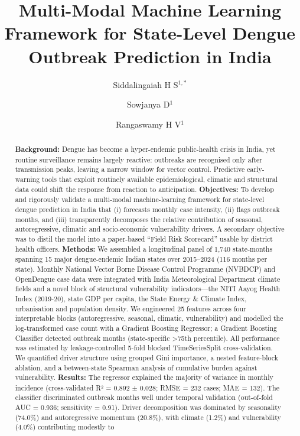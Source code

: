 \documentclass[
  10pt,
  twocolumn]{article}
\title{Multi-Modal Machine Learning Framework for State-Level Dengue
Outbreak Prediction in India}
\author{Siddalingaiah H S\(^{1,*}\) \and Sowjanya
D\(^{1}\) \and Rangaswamy H V\(^{1}\)}
\date{}
\begin{document}
\maketitle
\begin{abstract}
\textbf{Background:} Dengue has become a hyper-endemic public-health
crisis in India, yet routine surveillance remains largely reactive:
outbreaks are recognised only after transmission peaks, leaving a narrow
window for vector control. Predictive early-warning tools that exploit
routinely available epidemiological, climatic and structural data could
shift the response from reaction to anticipation. \textbf{Objectives:}
To develop and rigorously validate a multi-modal machine-learning
framework for state-level dengue prediction in India that (i) forecasts
monthly case intensity, (ii) flags outbreak months, and (iii)
transparently decomposes the relative contribution of seasonal,
autoregressive, climatic and socio-economic vulnerability drivers. A
secondary objective was to distil the model into a paper-based ``Field
Risk Scorecard'' usable by district health officers. \textbf{Methods:}
We assembled a longitudinal panel of 1,740 state-months spanning 15
major dengue-endemic Indian states over 2015--2024 (116 months per
state). Monthly National Vector Borne Disease Control Programme (NVBDCP)
and OpenDengue case data were integrated with India Meteorological
Department climate fields and a novel block of structural vulnerability
indicators---the NITI Aayog Health Index (2019-20), state GDP per
capita, the State Energy \& Climate Index, urbanisation and population
density. We engineered 25 features across four interpretable blocks
(autoregressive, seasonal, climatic, vulnerability) and modelled the
log-transformed case count with a Gradient Boosting Regressor; a
Gradient Boosting Classifier detected outbreak months (state-specific
\textgreater75th percentile). All performance was estimated by
leakage-controlled 5-fold blocked TimeSeriesSplit cross-validation. We
quantified driver structure using grouped Gini importance, a nested
feature-block ablation, and a between-state Spearman analysis of
cumulative burden against vulnerability. \textbf{Results:} The regressor
explained the majority of variance in monthly incidence (cross-validated
R² = 0.892 ± 0.028; RMSE = 232 cases; MAE = 132). The classifier
discriminated outbreak months well under temporal validation
(out-of-fold AUC = 0.936; sensitivity = 0.91). Driver decomposition was
dominated by seasonality (74.0\%) and autoregressive momentum (20.8\%),
with climate (1.2\%) and vulnerability (4.0\%) contributing modestly to

\end{abstract}
\end{document}
